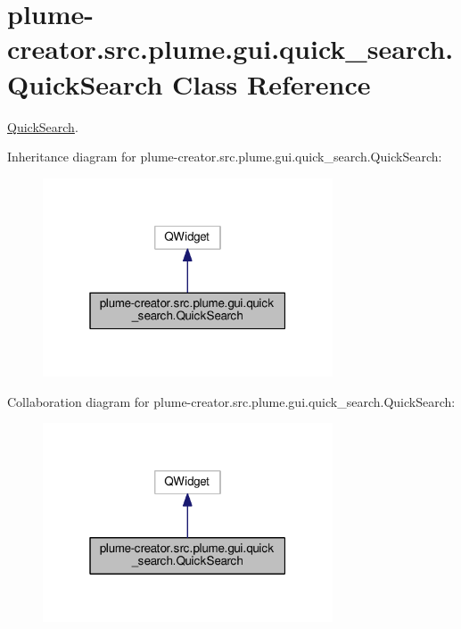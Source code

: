 \hypertarget{classplume-creator_1_1src_1_1plume_1_1gui_1_1quick__search_1_1_quick_search}{}\section{plume-\/creator.src.\+plume.\+gui.\+quick\+\_\+search.\+Quick\+Search Class Reference}
\label{classplume-creator_1_1src_1_1plume_1_1gui_1_1quick__search_1_1_quick_search}


\hyperlink{classplume-creator_1_1src_1_1plume_1_1gui_1_1quick__search_1_1_quick_search}{Quick\+Search}.  




Inheritance diagram for plume-\/creator.src.\+plume.\+gui.\+quick\+\_\+search.\+Quick\+Search\+:\nopagebreak
\begin{figure}[H]
\begin{center}
\leavevmode
\includegraphics[width=244pt]{classplume-creator_1_1src_1_1plume_1_1gui_1_1quick__search_1_1_quick_search__inherit__graph}
\end{center}
\end{figure}


Collaboration diagram for plume-\/creator.src.\+plume.\+gui.\+quick\+\_\+search.\+Quick\+Search\+:\nopagebreak
\begin{figure}[H]
\begin{center}
\leavevmode
\includegraphics[width=244pt]{classplume-creator_1_1src_1_1plume_1_1gui_1_1quick__search_1_1_quick_search__coll__graph}
\end{center}
\end{figure}
